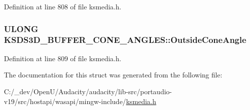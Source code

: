 Definition at line 808 of file ksmedia.\+h.

\subsubsection[{\texorpdfstring{Outside\+Cone\+Angle}{OutsideConeAngle}}]{\setlength{\rightskip}{0pt plus 5cm}U\+L\+O\+NG K\+S\+D\+S3\+D\+\_\+\+B\+U\+F\+F\+E\+R\+\_\+\+C\+O\+N\+E\+\_\+\+A\+N\+G\+L\+E\+S\+::\+Outside\+Cone\+Angle}\hypertarget{struct_k_s_d_s3_d___b_u_f_f_e_r___c_o_n_e___a_n_g_l_e_s_a8d8835bd0e405ce81cbf83ab188c0c9d}{}\label{struct_k_s_d_s3_d___b_u_f_f_e_r___c_o_n_e___a_n_g_l_e_s_a8d8835bd0e405ce81cbf83ab188c0c9d}


Definition at line 809 of file ksmedia.\+h.



The documentation for this struct was generated from the following file\+:\begin{DoxyCompactItemize}
\item 
C\+:/\+\_\+dev/\+Open\+U/\+Audacity/audacity/lib-\/src/portaudio-\/v19/src/hostapi/wasapi/mingw-\/include/\hyperlink{ksmedia_8h}{ksmedia.\+h}\end{DoxyCompactItemize}
